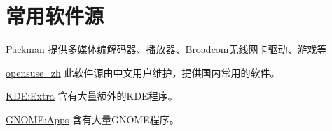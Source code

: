 \documentclass[10pt,openany]{book}
\begin{document}
\section{常用软件源}


\begin{compactdesc}
 \item[\href{http://mirrors.hust.edu.cn/packman/suse/openSUSE_13.1/}{Packman}]
 提供多媒体编解码器、播放器、Broadcom无线网卡驱动、游戏等
 \item[\href{http://download.opensuse.org/repositories/home:/opensuse_zh/openSUSE_13.1/}{opensuse\_zh}]
 此软件源由中文用户维护，提供国内常用的软件。
 \item[\href{http://download.opensuse.org/repositories/KDE:/Extra/openSUSE_13.1/}{KDE:Extra}]
 含有大量额外的KDE程序。
 \item[\href{http://download.opensuse.org/repositories/GNOME:/Apps/openSUSE_13.1/}{GNOME:Apps}]
 含有大量GNOME程序。
\end{compactdesc}
\end{document}
